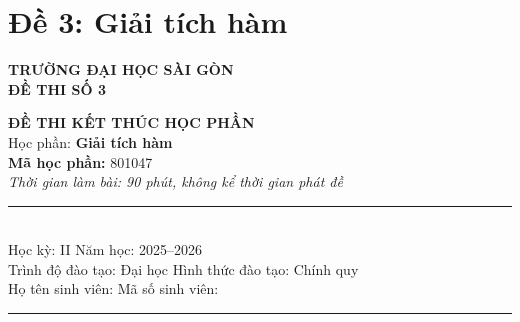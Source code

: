 
\section*{Đề 3: Giải tích hàm}

\noindent
\begin{minipage}[t]{0.45\textwidth}
    \begin{center}
        \textbf{TRƯỜNG ĐẠI HỌC SÀI GÒN}\\[0.3cm]
        \textbf{ĐỀ THI SỐ 3}
    \end{center}
\end{minipage}
\hfill
\begin{minipage}[t]{0.5\textwidth}
    \begin{center}
        \textbf{ĐỀ THI KẾT THÚC HỌC PHẦN}\\[0.2cm]
        Học phần: \textbf{Giải tích hàm}\\
        \textbf{Mã học phần:} 801047\\[0.2cm]
        \textit{Thời gian làm bài: 90 phút, không kể thời gian phát đề}
    \end{center}
\end{minipage}

\vspace{0.8cm}

\noindent
\rule{\textwidth}{0.5pt}\\[0.2cm]
Học kỳ: II \dotfill Năm học: 2025--2026 \dotfill\\[0.2cm]
Trình độ đào tạo: Đại học \dotfill Hình thức đào tạo: Chính quy \dotfill\\[0.2cm]
Họ tên sinh viên: \dotfill Mã số sinh viên: \dotfill\\[0.2cm]
\rule{\textwidth}{0.5pt}

\vspace{0.8cm}

\begin{center}
\end{center}


